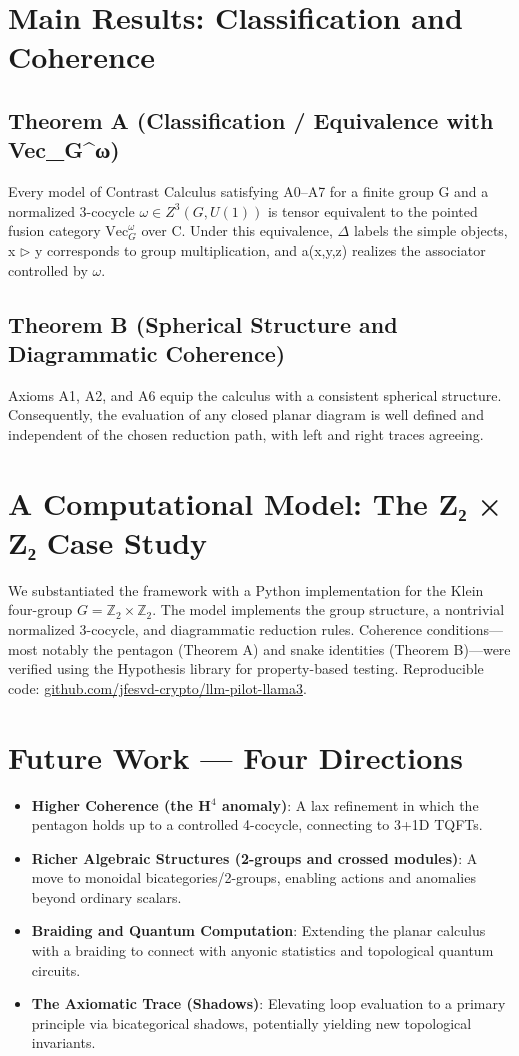 \documentclass[11pt]{article}
\theoremstyle{definition}
\theoremstyle{remark}
\newcommand{\tens}{\mathbin{\triangleright}}
\begin{document}
\section{Main Results: Classification and Coherence}
\subsection{Theorem A (Classification / Equivalence with Vec_G^ω)}
Every model of Contrast Calculus satisfying A0–A7 for a finite group G and a normalized 3-cocycle $\omega \in Z^3(G, U(1))$ is tensor equivalent to the pointed fusion category $\mathrm{Vec}_G^\omega$ over C. Under this equivalence, $\Delta$ labels the simple objects, x $\tens$ y corresponds to group multiplication, and a(x,y,z) realizes the associator controlled by $\omega$.

\subsection{Theorem B (Spherical Structure and Diagrammatic Coherence)}
Axioms A1, A2, and A6 equip the calculus with a consistent spherical structure. Consequently, the evaluation of any closed planar diagram is well defined and independent of the chosen reduction path, with left and right traces agreeing.

\section{A Computational Model: The Z₂ × Z₂ Case Study}
We substantiated the framework with a Python implementation for the Klein four-group $G=\mathbb{Z}_2 \times \mathbb{Z}_2$. The model implements the group structure, a nontrivial normalized 3-cocycle, and diagrammatic reduction rules. Coherence conditions—most notably the pentagon (Theorem A) and snake identities (Theorem B)—were verified using the Hypothesis library for property-based testing. Reproducible code: \href{https://github.com/jfesvd-crypto/llm-pilot-llama3}{github.com/jfesvd-crypto/llm-pilot-llama3}.

\section{Future Work — Four Directions}
\begin{itemize}
    \item \textbf{Higher Coherence (the H$^4$ anomaly)}: A lax refinement in which the pentagon holds up to a controlled 4-cocycle, connecting to 3+1D TQFTs.
    \item \textbf{Richer Algebraic Structures (2-groups and crossed modules)}: A move to monoidal bicategories/2-groups, enabling actions and anomalies beyond ordinary scalars.
    \item \textbf{Braiding and Quantum Computation}: Extending the planar calculus with a braiding to connect with anyonic statistics and topological quantum circuits.
    \item \textbf{The Axiomatic Trace (Shadows)}: Elevating loop evaluation to a primary principle via bicategorical shadows, potentially yielding new topological invariants.
\end{itemize}
\end{document}
